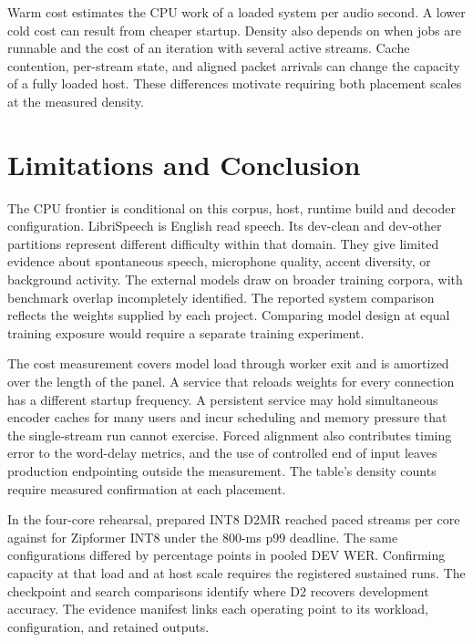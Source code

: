 \documentclass[conference]{IEEEtran}
\begin{document}
Warm cost estimates the CPU work of a loaded system per audio second.
A lower cold cost can result from cheaper startup. Density also depends
on when jobs are runnable and the cost of an iteration with several active
streams. Cache contention, per-stream state, and aligned packet arrivals
can change the capacity of a fully loaded host. These differences motivate
requiring both placement scales at the measured density.

\section{Limitations and Conclusion}

The CPU frontier is conditional on this corpus, host, runtime build and
decoder configuration. LibriSpeech is English read speech. Its dev-clean
and dev-other partitions represent different difficulty within that domain.
They give limited evidence about spontaneous speech, microphone quality,
accent diversity, or background activity. The external models draw on
broader training corpora, with benchmark overlap incompletely identified.
The reported system comparison reflects the weights supplied by each project.
Comparing model design at equal training exposure would require a separate
training experiment.

The cost measurement covers model load through worker exit and is
amortized over the length of the panel. A service that reloads weights for
every connection has a different startup frequency. A persistent service may
hold simultaneous encoder caches for many users and incur scheduling and
memory pressure that the single-stream run cannot exercise. Forced alignment
also contributes timing error to the word-delay metrics, and the use of
controlled end of input leaves production endpointing outside the measurement.
The table's density counts require measured confirmation at each placement.

In the four-core rehearsal, prepared INT8 D2MR reached
 paced streams per core against
 for Zipformer INT8 under the
800-ms p99 deadline. The same configurations differed by
 percentage points in pooled
DEV WER. Confirming capacity at that load and at host scale requires the
registered sustained runs. The checkpoint and search comparisons identify
where D2 recovers development accuracy. The evidence manifest links each
operating point to its workload, configuration, and retained outputs.



\end{document}
